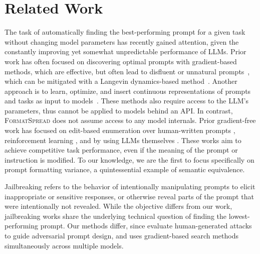 \documentclass{article} %
\renewcommand{\paragraph}[1]{\textbf{#1}}
\newcommand{\toolname}[1]{}
\renewcommand{\toolname}[1]{{\color{black} \textsc{FormatSpread}}}
\begin{document}
\section{Related Work}
\vspace{-1mm}
The task of automatically finding the best-performing prompt for a given task without changing model parameters has recently gained attention, given the constantly improving yet somewhat unpredictable performance of LLMs. 
Prior work has often focused on discovering optimal prompts with gradient-based methods, which are effective, but often lead to disfluent or unnatural prompts~\citep{shin2020autoprompt}, which can be mitigated with a Langevin dynamics-based method~\citep{shi2022toward}. 
Another approach is to learn, optimize, and insert continuous representations of prompts and tasks as input to models~\citep{qin2021learning,lester2021power,ding2022openprompt,ilharco23}.
These methods also require access to the LLM's parameters, thus cannot be applied to models behind an API. 
In contrast, \toolname{} does not assume access to any model internals.
Prior gradient-free work has focused on edit-based enumeration over human-written prompts \citep{prasad2022grips}, reinforcement learning \citep{deng2022rlprompt}, and by using LLMs themselves \citep{zhou2022large,gao2020making}. 
These works aim to achieve competitive task performance, even if the meaning of the prompt or instruction is modified. 
To our knowledge, we are the first to focus specifically on prompt formatting variance, a quintessential example of semantic equivalence. 

Jailbreaking refers to the behavior of intentionally manipulating prompts to elicit inappropriate or sensitive responses, or otherwise reveal parts of the prompt that were intentionally not revealed.
While the objective differs from our work, jailbreaking works \citep{wei2023jailbroken,zou2023universal} share the underlying technical question of finding the lowest-performing prompt. Our methods differ, since \cite{wei2023jailbroken} evaluate human-generated attacks to guide adversarial prompt design, and \cite{zou2023universal} uses gradient-based search methods simultaneously across multiple models.
\end{document}
